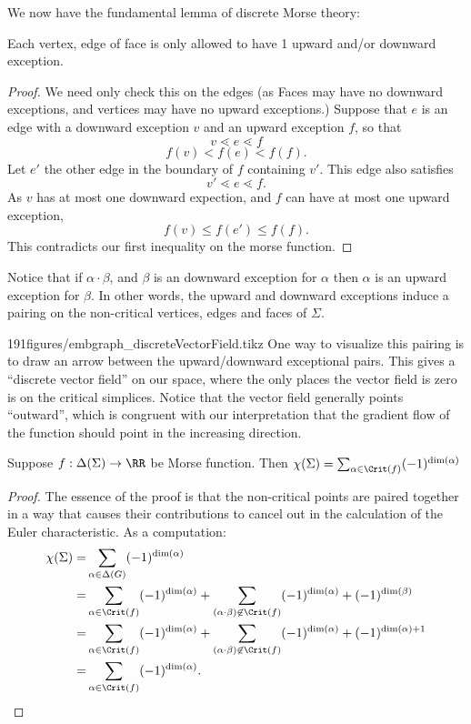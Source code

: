 We now have the fundamental lemma of discrete Morse theory:

\begin{lemma}
Each vertex, edge of face is only allowed to have 1 upward and/or downward exception. 
\end{lemma}
\begin{proof}
	We need only check this on the edges (as Faces may have no downward exceptions, and vertices may have no upward exceptions.)
	Suppose that $e$ is an edge with a downward exception $v$ and an upward exception $f$, so that 
	\[v\lessdot e\lessdot f\]
	\[f(v)< f(e)< f(f).\]
	Let $e'$ the other edge in the boundary of $f$ containing $v'$. This edge also satisfies
	\[v'\lessdot e\lessdot f.\]
	As $v$ has at most one downward expection, and $f$ can have at most one upward exception, 
	\[f(v)\leq f(e') \leq f(f).\]
	This contradicts our first inequality on the morse function. 
\end{proof}
Notice that if $\alpha\cdot \beta$, and $\beta$ is an downward exception for $\alpha$ then $\alpha$ is an upward exception for $\beta$. In other words, the upward and downward exceptions induce a pairing on the non-critical vertices, edges and faces of $\Sigma$. \\
\begin{examplefigureenv}{191figures/embgraph_discreteVectorField.tikz}
	One way to visualize this pairing is to draw an arrow between the upward/downward exceptional pairs. This gives a ``discrete vector field'' on our space, where the only places the vector field is zero is on the critical simplices. Notice that the vector field generally points ``outward'', which is congruent with our interpretation that the gradient flow of the function should point in the increasing direction. 
\end{examplefigureenv}
\begin{theorem}
	Suppose $f: \Delta(\Sigma) \to \RR$  be Morse function. Then 
	$\chi(\Sigma)= \sum_{\alpha\in \Crit(f)} (-1)^{\dim(\alpha)}$
\end{theorem}
\begin{proof}
The essence of the proof is that the non-critical points are paired together in a way that causes their contributions to cancel out in the calculation of the Euler characteristic. As a computation:
\begin{align*}
\chi(\Sigma)=& \sum_{\alpha\in \Delta(G)}(-1)^{\dim(\alpha)}\\
=&\sum_{\alpha\in \Crit(f)} (-1)^{\dim(\alpha)} + \sum_{(\alpha \cdot \beta)\not\in \Crit(f)} (-1)^{\dim(\alpha)}+(-1)^{\dim(\beta)}\\
=&\sum_{\alpha\in \Crit(f)} (-1)^{\dim(\alpha) }+ \sum_{(\alpha \cdot \beta)\not\in \Crit(f)} (-1)^{\dim(\alpha)}+(-1)^{\dim(\alpha)+1}\\
=&\sum_{\alpha\in \Crit(f)} (-1)^{\dim(\alpha)}.
\end{align*}
\end{proof}



